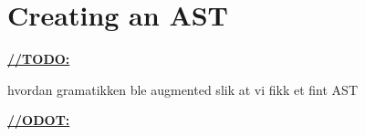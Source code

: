 \section{Creating an AST}
\underline{\textbf{\LARGE //TODO:}}

hvordan gramatikken ble augmented slik at vi fikk et fint AST

\underline{\textbf{\LARGE //ODOT:}}